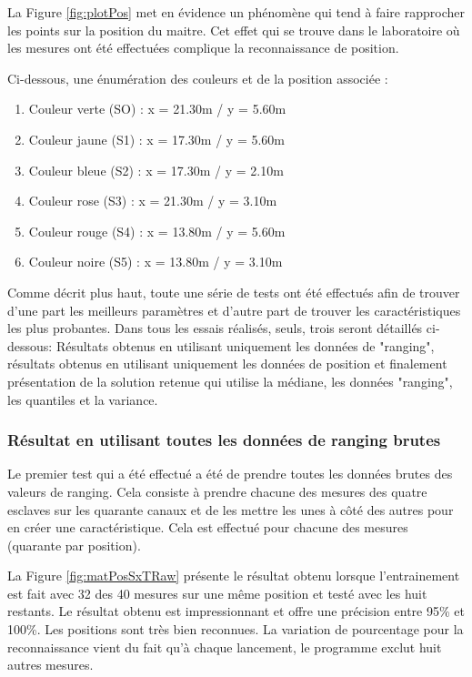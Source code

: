 La Figure \ref{fig:plotPos} met en évidence un phénomène qui tend à faire rapprocher les points sur la position du maitre. Cet effet qui se trouve dans le laboratoire où les mesures ont été effectuées complique la reconnaissance de position.

Ci-dessous, une énumération des couleurs et de la position associée : 
\begin{enumerate}
 \item Couleur verte (SO) : x = 21.30m / y = 5.60m
 \item Couleur jaune (S1)  : x = 17.30m / y = 5.60m
 \item Couleur bleue (S2) : x = 17.30m / y = 2.10m
 \item Couleur rose (S3) : x = 21.30m / y = 3.10m
 \item Couleur rouge (S4) : x = 13.80m / y = 5.60m 
 \item Couleur noire (S5) : x = 13.80m / y = 3.10m 
\end{enumerate} 

Comme décrit plus haut, toute une série de tests ont été effectués afin de trouver d'une part les meilleurs paramètres et d'autre part de trouver les caractéristiques les plus probantes. Dans tous les essais réalisés, seuls, trois seront détaillés ci-dessous: Résultats obtenus en utilisant uniquement les données de "ranging", résultats obtenus en utilisant uniquement les données de position et finalement présentation de la solution retenue qui utilise la médiane, les données "ranging", les quantiles et la variance.

\subsubsection{Résultat en utilisant toutes les données de ranging brutes}
Le premier test qui a été effectué a été de prendre toutes les données brutes des valeurs de ranging. Cela consiste à prendre chacune des mesures des quatre esclaves sur les quarante canaux et de les mettre les unes à côté des autres pour en créer une caractéristique. Cela est effectué pour chacune des mesures (quarante par position).  

La Figure \ref{fig:matPosSxTRaw} présente le résultat obtenu lorsque l'entrainement est fait avec 32 des 40 mesures sur une même position et testé avec les huit restants. Le résultat obtenu est impressionnant et offre une précision entre 95\% et 100\%. Les positions sont très bien reconnues. La variation de pourcentage pour la reconnaissance vient du fait qu'à chaque lancement, le programme exclut huit autres mesures.

